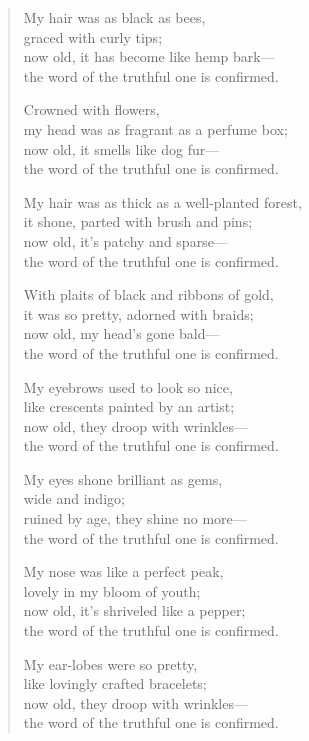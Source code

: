 \documentclass[12pt,openany]{book}%
\begin{document}
\begin{verse}%
My hair was as black as bees, \\
graced with curly tips; \\
now old, it has become like hemp bark—\\
the word of the truthful one is confirmed. 

Crowned with flowers, \\
my head was as fragrant as a perfume box; \\
now old, it smells like dog fur—\\
the word of the truthful one is confirmed. 

My hair was as thick as a well-planted forest, \\
it shone, parted with brush and pins; \\
now old, it’s patchy and sparse—\\
the word of the truthful one is confirmed. 

With plaits of black and ribbons of gold, \\
it was so pretty, adorned with braids; \\
now old, my head’s gone bald—\\
the word of the truthful one is confirmed. 

My eyebrows used to look so nice, \\
like crescents painted by an artist; \\
now old, they droop with wrinkles—\\
the word of the truthful one is confirmed. 

My eyes shone brilliant as gems, \\
wide and indigo; \\
ruined by age, they shine no more—\\
the word of the truthful one is confirmed. 

My nose was like a perfect peak, \\
lovely in my bloom of youth; \\
now old, it’s shriveled like a pepper; \\
the word of the truthful one is confirmed. 

My ear-lobes were so pretty, \\
like lovingly crafted bracelets; \\
now old, they droop with wrinkles—\\
the word of the truthful one is confirmed. 


\end{verse}
\end{document}
